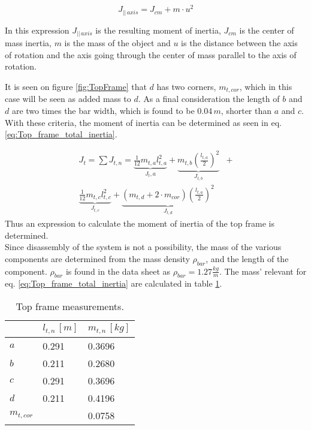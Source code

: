 \documentclass[../../main]{subfiles}
\begin{document}
\begin{equation}
  \label{eq:parallel_axis_theorem}
  J_{||\,axis} = J_{cm} + m\cdot u^2
\end{equation}

In this expression $J_{||\,axis}$ is the resulting moment of inertia, $J_{cm}$ is the center of mass inertia, $m$ is the mass of the object and $u$ is the distance between the axis of rotation and the axis going through the center of mass parallel to the axis of rotation.

It is seen on figure \ref{fig:TopFrame} that $d$ has two corners, $m_{t,cor}$, which in this case will be seen as added mass to $d$. As a final consideration the length of $b$ and $d$ are two times the bar width, which is found to be $0.04\si{\,m}$, shorter than $a$ and $c$. With these criteria, the moment of inertia can be determined as seen in eq. \eqref{eq:Top_frame_total_inertia}.

\begin{equation}
  \label{eq:Top_frame_total_inertia}
\begin{split}
  J_t = \sum J_{t,n} =
  \underbrace{\frac{1}{12}m_{t,a}l_{t,a}^2}_\text{$J_t,a$} +
  \underbrace{m_{t,b}\left(\frac{l_{t,a}}{2}\right)^2}_\text{$J_{t,b}$} &+ \\
  \underbrace{ \frac{1}{12} m_{t,c}l_{t,c}^2}_\text{$J_{t,c}$} +
  \underbrace{(m_{t,d} + 2\cdot m_{cor})\left(\frac{l_{t,a}}{2}\right)^2}_\text{$J_{t,d}$}
\end{split}
\end{equation}
Thus an expression to calculate the moment of inertia of the top frame is determined.\\
Since disassembly of the system is not a possibility, the mass of the various components are determined from the mass density $\rho_{bar}$, and the length of the component. $\rho_{bar}$ is found in the data sheet\cite{Frame_bars} as $\rho_{bar} = 1.27 \si{\frac{kg}{m}}$. The mass' relevant for eq. \eqref{eq:Top_frame_total_inertia} are calculated in table \ref{tab:Top_frame_table}.

\begin{table}[H]
\centering
\begin{tabular}{|l|l|l|}
\hline
  & $l_{t,n} \, \si{[m]}$ & $m_{t,n} \, \si{[kg]}$ \\
\hline
$a$ & 0.291  & 0.3696  \\
\hline
$b$ & 0.211  & 0.2680  \\
\hline
$c$ & 0.291 & 0.3696  \\
\hline
$d$ & 0.211 & 0.4196  \\
\hline
$m_{t,cor}$ & & 0.0758 \\
\hline
\end{tabular}
\caption{Top frame measurements.}
    \label{tab:Top_frame_table}
\end{table}
\end{document}
